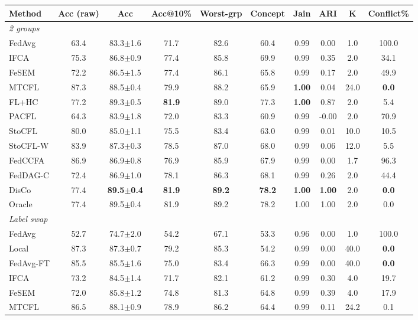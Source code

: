 \scriptsize
\setlength{\tabcolsep}{3.2pt}
\begin{tabular}{lccccccccc}
\toprule
Method & Acc (raw) & Acc & Acc@10\% & Worst-grp & Concept & Jain & ARI & K & Conflict\% \\
\midrule
\multicolumn{10}{l}{\textit{2 groups}}\\
FedAvg & 63.4 & 83.3$\pm$1.6 & 71.7 & 82.6 & 60.4 & 0.99 & 0.00 & 1.0 & 100.0 \\
IFCA & 75.3 & 86.8$\pm$0.9 & 77.4 & 85.8 & 69.9 & 0.99 & 0.35 & 2.0 & 34.1 \\
FeSEM & 72.2 & 86.5$\pm$1.5 & 77.4 & 86.1 & 65.8 & 0.99 & 0.17 & 2.0 & 49.9 \\
MTCFL & 87.3 & 88.5$\pm$0.4 & 79.9 & 88.2 & 65.9 & \textbf{1.00} & 0.04 & 24.0 & \textbf{0.0} \\
FL+HC & 77.2 & 89.3$\pm$0.5 & \textbf{81.9} & 89.0 & 77.3 & \textbf{1.00} & 0.87 & 2.0 & 5.4 \\
PACFL & 64.3 & 83.9$\pm$1.8 & 72.0 & 83.3 & 60.9 & 0.99 & -0.00 & 2.0 & 70.9 \\
StoCFL & 80.0 & 85.0$\pm$1.1 & 75.5 & 83.4 & 63.0 & 0.99 & 0.01 & 10.0 & 10.5 \\
StoCFL-W & 83.9 & 87.3$\pm$0.3 & 78.5 & 87.0 & 68.0 & 0.99 & 0.06 & 12.0 & 5.5 \\
FedCCFA & 86.9 & 86.9$\pm$0.8 & 76.9 & 85.9 & 67.9 & 0.99 & 0.00 & 1.7 & 96.3 \\
FedDAG-C & 72.4 & 86.9$\pm$1.0 & 78.1 & 86.3 & 68.1 & 0.99 & 0.26 & 2.0 & 44.4 \\
DisCo & 77.4 & \textbf{89.5$\pm$0.4} & \textbf{81.9} & \textbf{89.2} & \textbf{78.2} & \textbf{1.00} & \textbf{1.00} & 2.0 & \textbf{0.0} \\
Oracle & 77.4 & 89.5$\pm$0.4 & 81.9 & 89.2 & 78.2 & 1.00 & 1.00 & 2.0 & 0.0 \\
\midrule
\multicolumn{10}{l}{\textit{Label swap}}\\
FedAvg & 52.7 & 74.7$\pm$2.0 & 54.2 & 67.1 & 53.3 & 0.96 & 0.00 & 1.0 & 100.0 \\
Local & 87.3 & 87.3$\pm$0.7 & 79.2 & 85.3 & 54.2 & 0.99 & 0.00 & 40.0 & \textbf{0.0} \\
FedAvg-FT & 85.5 & 85.5$\pm$1.6 & 75.0 & 83.4 & 66.3 & 0.99 & 0.00 & 40.0 & \textbf{0.0} \\
IFCA & 73.2 & 84.5$\pm$1.4 & 71.7 & 82.1 & 61.2 & 0.99 & 0.30 & 4.0 & 19.7 \\
FeSEM & 72.0 & 85.8$\pm$1.2 & 74.8 & 81.3 & 64.8 & 0.99 & 0.39 & 4.0 & 17.9 \\
MTCFL & 86.5 & 88.1$\pm$0.9 & 78.9 & 86.2 & 64.4 & 0.99 & 0.11 & 24.2 & 0.1 \\

\end{tabular}
